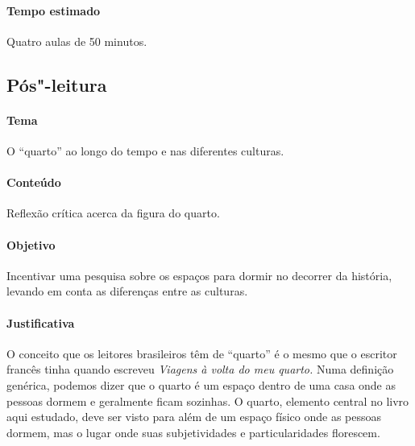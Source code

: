 \documentclass[12pt]{extarticle}
\begin{document}
\paragraph{Tempo estimado} Quatro aulas de 50 minutos.


\subsection{Pós"-leitura}


\paragraph{Tema} O ``quarto'' ao longo do tempo e nas diferentes culturas.

\paragraph{Conteúdo} Reflexão crítica acerca da figura do quarto.

\paragraph{Objetivo} Incentivar uma pesquisa sobre os espaços para dormir 
no decorrer da história, levando em conta as diferenças entre as culturas.


\paragraph{Justificativa} O conceito que os leitores brasileiros
têm de ``quarto'' é o mesmo que o escritor francês tinha 
quando escreveu \emph{Viagens à volta do meu quarto.} Numa definição genérica,
podemos dizer que o quarto é um espaço dentro de uma casa onde as pessoas dormem
e geralmente ficam sozinhas. 
O quarto, elemento central no livro aqui estudado, deve ser visto
para além de um espaço físico onde as pessoas dormem,
mas o lugar onde suas subjetividades e particularidades florescem.  
\end{document}
